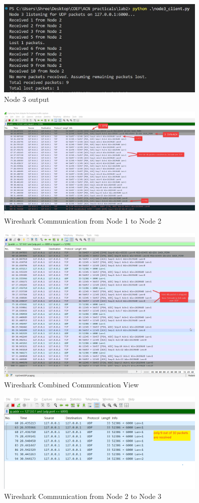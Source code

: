 \documentclass{article}
\begin{document}
\begin{figure}[htbp]
    \centering
    \includegraphics[angle=270,width=10cm]{node03.jpeg}
    \caption{Node 3 output}
    \label{fig:node03}
\end{figure}

\begin{figure}[htbp]
    \centering
    \includegraphics[angle=270,width=10cm]{WSNode1ToNode2.png}
    \caption{Wireshark Communication from Node 1 to Node 2}
    \label{fig:node1ToNode2}
\end{figure}

\begin{figure}[htbp]
    \centering
    \includegraphics[angle=270,width=10cm]{WScombinedComm.png}
    \caption{Wireshark Combined Communication View}
    \label{fig:combinedComm}
\end{figure}


\begin{figure}[htbp]
    \centering
    \includegraphics[angle=270,width=10cm]{WSNode2ToNode3.png}
    \caption{Wireshark Communication from Node 2 to Node 3}
    \label{fig:node2ToNode3}
\end{figure}
\end{document}
